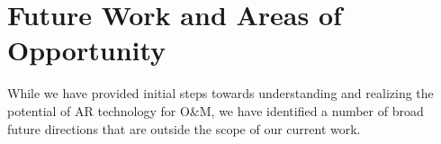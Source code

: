 \documentclass[chi_draft]{sigchi}
\newcommand{\OM}{O\&M\xspace}
\begin{document}
%
%
%
%


\section{Future Work and Areas of Opportunity}
While we have provided initial steps towards understanding and realizing the potential of AR technology for \OM, we have identified a number of broad future directions that are outside the scope of our current work.
\end{document}
